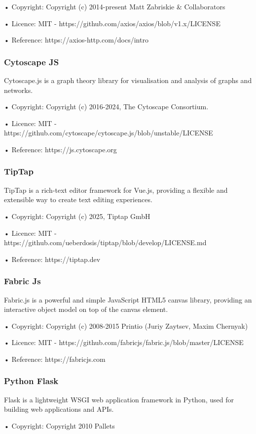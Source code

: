 • Copyright: Copyright (c) 2014-present Matt Zabriskie \& Collaborators

• Licence: MIT -  https://github.com/axios/axios/blob/v1.x/LICENSE

• Reference:  https://axios-http.com/docs/intro

\subsubsection{Cytoscape JS}
Cytoscape.js is a graph theory library for visualisation and analysis of graphs and networks.

• Copyright: Copyright (c) 2016-2024, The Cytoscape Consortium.

• Licence: MIT -  https://github.com/cytoscape/cytoscape.js/blob/unstable/LICENSE

• Reference:  https://js.cytoscape.org

\subsubsection{TipTap}
TipTap is a rich-text editor framework for Vue.js, providing a flexible and extensible way to create text editing experiences.

• Copyright: Copyright (c) 2025, Tiptap GmbH

• Licence: MIT -  https://github.com/ueberdosis/tiptap/blob/develop/LICENSE.md

• Reference:  https://tiptap.dev

\subsubsection{Fabric Js}
Fabric.js is a powerful and simple JavaScript HTML5 canvas library, providing an interactive object model on top of the canvas element.

• Copyright: Copyright (c) 2008-2015 Printio (Juriy Zaytsev, Maxim Chernyak)

• Licence: MIT -  https://github.com/fabricjs/fabric.js/blob/master/LICENSE

• Reference:  https://fabricjs.com

\subsubsection{Python Flask}
Flask is a lightweight WSGI web application framework in Python, used for building web applications and APIs.

• Copyright: Copyright 2010 Pallets

